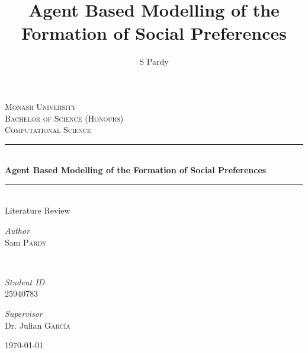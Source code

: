 \documentclass[11pt]{article}
\title{Agent Based Modelling of the Formation of Social Preferences}
\author{S Pardy}
\begin{document}
\begin{titlepage}
	\newcommand{\HRule}{\rule{\linewidth}{0.5mm}} %
	
	\center %
	
	
	\textsc{\LARGE Monash University}\\[1.5cm]	
	\textsc{\Large Bachelor of Science (Honours)}\\[0.5cm] %
	
	\textsc{\large Computational Science}\\[0.5cm] %
	
	
	\HRule\\[0.4cm]
	
	{\huge\bfseries Agent Based Modelling of the Formation of Social Preferences}\\[0.4cm]
	
    \HRule\\[1.5cm]
    

	
	{\huge Literature Review }\\[0.4cm]
	
    
    

   \vfill\vfill

	
	\begin{minipage}{0.4\textwidth}
		\begin{flushleft}
			\large
			\textit{Author}\\
			Sam \textsc{Pardy}
		\end{flushleft}
	\end{minipage}
	~
	\begin{minipage}{0.4\textwidth}
		\begin{flushright}
			\large 
			\textit{Student ID}\\
		25940783   
		\end{flushright}
	\end{minipage}
	\vfill
	\vfill
	{\large
	\textit{Supervisor}\\
	Dr. Julian \textsc{García}}
	

	\vfill\vfill\vfill %
	{\large\today} %
	\vfill %
	
\end{titlepage}
\hypersetup{colorlinks, citecolor=black, filecolor=black, linkcolor=black urlcolor=black}
\end{document}
